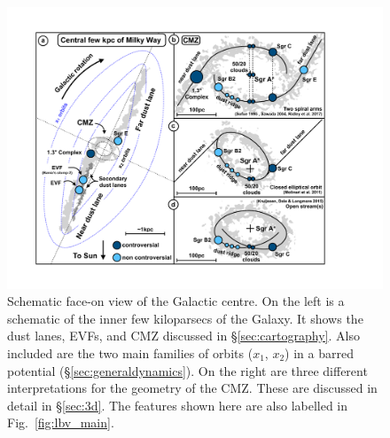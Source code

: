 \begin{figure}[!t]
    \centering
 	\includegraphics[trim=2.5cm 2.cm 5cm 2.cm, clip, width=1.0\columnwidth]{./figs/sketch.pdf}
    \caption{Schematic face-on view of the Galactic centre. On the left is a schematic of the inner few kiloparsecs of the Galaxy. It shows the dust lanes, EVFs, and CMZ discussed in \S\ref{sec:cartography}. Also included are the two main families of orbits ($x_1$, $x_2$) in a barred potential (\S\ref{sec:generaldynamics}). On the right are three different interpretations for the geometry of the CMZ. These are discussed in detail in \S\ref{sec:3d}. The features shown here are also labelled in Fig.~\ref{fig:lbv_main}. }
    \label{fig:sketch}
\end{figure}
